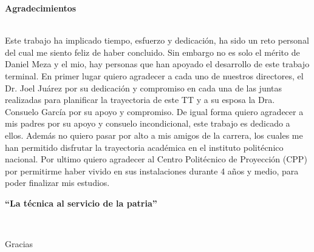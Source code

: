 




\begin{LARGE}
	\textbf{Agradecimientos}\\\\
\end{LARGE}



\begin{tcolorbox}[adjusted title=flush center,halign title=flush center,titlerule=3mm,title= \large{Carlos A. Hernandez G.}] 

Este trabajo ha implicado tiempo, esfuerzo y dedicación, ha sido un reto personal del cual me siento feliz de haber concluido. Sin embargo no es solo el mérito de Daniel Meza y el mio, hay personas que han apoyado el desarrollo de este trabajo terminal. En primer lugar quiero agradecer a cada uno de nuestros directores, el Dr. Joel Juárez por su dedicación y compromiso en cada una de las juntas realizadas para planificar la trayectoria de este TT y a su esposa la Dra. Consuelo García por su apoyo y compromiso. De igual forma quiero agradecer a mis padres por su apoyo y consuelo incondicional, este trabajo es dedicado a ellos. Además no quiero pasar por alto a mis amigos de la carrera, los cuales me han permitido disfrutar la trayectoria académica en el instituto politécnico nacional. Por ultimo quiero agradecer al Centro Politécnico de Proyección (CPP) por permitirme haber vivido en sus instalaciones durante 4 años y medio, para poder finalizar mis estudios.\\

\begin{center}\textbf{``La técnica al servicio de la patria''}\end{center}



\end{tcolorbox}

\ \\

\begin{tcolorbox}[adjusted title=flush center,halign title=flush center,titlerule=3mm,title= \large{Luis D. Meza M.}] 
Gracias 
\end{tcolorbox}

